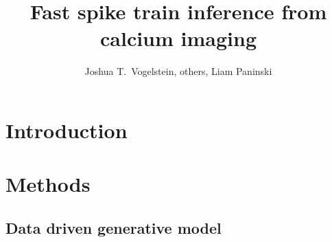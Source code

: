  
\usepackage{multicol}
\usepackage{hyperref}
\newcommand{\zzz}{z}
\newcommand{\xT}{\ve{C}}
\newcommand{\yT}{\ve{y}}
\newcommand{\nT}{\ve{n}}
\newcommand{\zT}{\ve{n}}
\newcommand{\FT}{\ve{F}}
\newcommand{\lT}{\ve{\lam}}
\newcommand{\wX}{\widehat{\ve{C}}}
\newcommand{\wY}{\widehat{\ve{Y}}}
\newcommand{\CaT}{\Cav}
\newcommand{\ax}{\argmax_{\ve{C}_t \geq 0 \forall t}}
\newcommand{\an}{\argmin_{n_t \geq 0 \forall t}}
\newcommand{\az}{\argmin_{\bM \bC \geq \ve{0}}}
\newcommand{\ath}{\argmax_{\bth \in \ve{\Theta}}}
\newcommand{\anx}{\argmax_{n_t \in \mathbb{N}_0 \forall t}}
\newcommand{\ann}{\argmin_{n_t \in \mathbb{N}_0 \forall t}}
\newcommand{\hnm}{\widehat{\bn}}
\newcommand{\hCm}{\widehat{\bC}}
\newcommand{\transpo}[1]{{#1}^{\ensuremath{\mathsf{T}}}}           %
\newcommand\transp{{\!\scriptscriptstyle\mathrm T}}


\title{Fast spike train inference from calcium imaging}

\author{Joshua T.~Vogelstein, others, Liam Paninski}



\maketitle
\tableofcontents
\begin{abstract}
 
\end{abstract}

\newpage
\section{Introduction}


\newpage
\section{Methods} \label{sec:methods}


\subsection{Data driven generative model} \label{sec:model}


